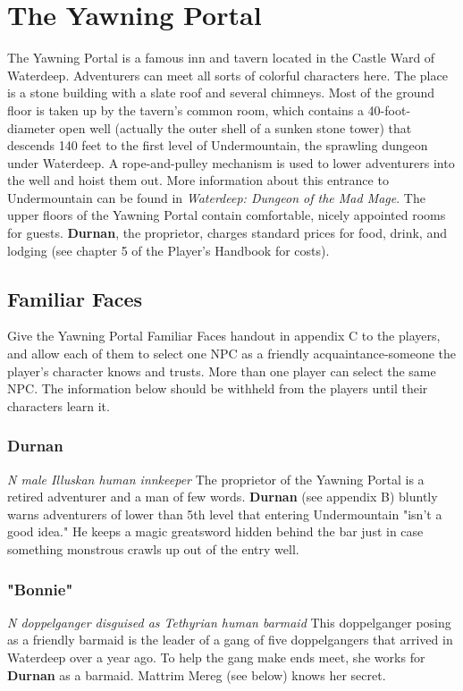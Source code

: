 \documentclass[10pt,a4paper,twoside,twocolumn,openany,nodeprecatedcode]{dndbook}
\begin{document}
\section{The Yawning Portal}
The Yawning Portal is a famous inn and tavern located in the Castle Ward of Waterdeep. Adventurers can meet all sorts of colorful characters here.
The place is a stone building with a slate roof and several chimneys. Most of the ground floor is taken up by the tavern's common room, which contains a 40-foot-diameter open well (actually the outer shell of a sunken stone tower) that descends 140 feet to the first level of Undermountain, the sprawling dungeon under Waterdeep. A rope-and-pulley mechanism is used to lower adventurers into the well and hoist them out. More information about this entrance to Undermountain can be found in \textit{Waterdeep: Dungeon of the Mad Mage}.
The upper floors of the Yawning Portal contain comfortable, nicely appointed rooms for guests.
\textbf{Durnan}, the proprietor, charges standard prices for food, drink, and lodging (see chapter 5 of the Player's Handbook for costs).
\subsection{Familiar Faces}
Give the Yawning Portal Familiar Faces handout in appendix C to the players, and allow each of them to select one NPC as a friendly acquaintance-someone the player's character knows and trusts. More than one player can select the same NPC. The information below should be withheld from the players until their characters learn it.
\subsubsection{Durnan}
\textit{N male Illuskan human innkeeper}
The proprietor of the Yawning Portal is a retired adventurer and a man of few words. \textbf{Durnan} (see appendix B) bluntly warns adventurers of lower than 5th level that entering Undermountain "isn't a good idea." He keeps a magic greatsword hidden behind the bar just in case something monstrous crawls up out of the entry well.
\subsubsection{"Bonnie"}
\textit{N doppelganger disguised as Tethyrian human barmaid}
This doppelganger posing as a friendly barmaid is the leader of a gang of five doppelgangers that arrived in Waterdeep over a year ago. To help the gang make ends meet, she works for \textbf{Durnan} as a barmaid. Mattrim Mereg (see below) knows her secret.
\end{document}
